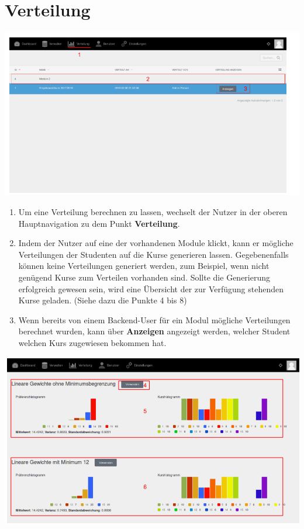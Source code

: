   
  \section{Verteilung}
  \label{section:distribution}
  
  \includegraphics[scale=0.3]{backend/img/distribution_1 .png}
  
  \begin{enumerate}
   \item Um eine Verteilung berechnen zu lassen, wechselt der Nutzer in der oberen Hauptnavigation zu dem Punkt \textbf{Verteilung}.
   \item Indem der Nutzer auf eine der vorhandenen Module klickt, kann er mögliche Verteilungen der Studenten auf die Kurse generieren lassen.
	 Gegebenenfalls können keine Verteilungen generiert werden, zum Beispiel, wenn nicht genügend Kurse zum Verteilen vorhanden sind.
	 Sollte die Generierung erfolgreich gewesen sein, wird eine Übersicht der zur Verfügung stehenden Kurse geladen. 
	 (Siehe dazu die Punkte 4 bis 8)
   \item Wenn bereits von einem Backend-User für ein Modul mögliche Verteilungen berechnet wurden, kann über \textbf{Anzeigen} angezeigt werden, welcher Student welchen Kurs zugewiesen bekommen hat.
  \end{enumerate}
  
  \includegraphics[scale=0.3]{backend/img/distribution_2.png}
  
